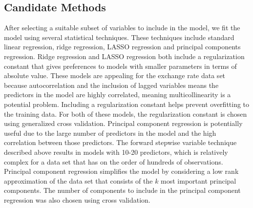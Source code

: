 \documentclass{sig-alternate-05-2015}
\begin{document}
\subsection{Candidate Methods}
After selecting a suitable subset of variables to include in the model, we fit the model using several statistical techniques. These techniques include standard linear regression, ridge regression, LASSO regression and principal components regression. Ridge regression and LASSO regression both include a regularization constant that gives preferences to models with smaller parameters in terms of absolute value. These models are appealing for the exchange rate data set because autocorrelation and the inclusion of lagged variables means the predictors in the model are highly correlated, meaning multicollinearity is a potential problem. Including a regularization constant helps prevent overfitting to the training data. For both of these models, the regularization constant is chosen using generalized cross validation. Principal component regression is potentially useful due to the large number of predictors in the model and the high correlation between those predictors. The forward stepwise variable technique described above results in models with 10-20 predictors, which is relatively complex for a data set that has on the order of hundreds of observations. Principal component regression simplifies the model by considering a low rank approximation of the data set that consists of the $k$ most important principal components. The number of components to include in the principal component regression was also chosen using cross validation. 
\end{document}
